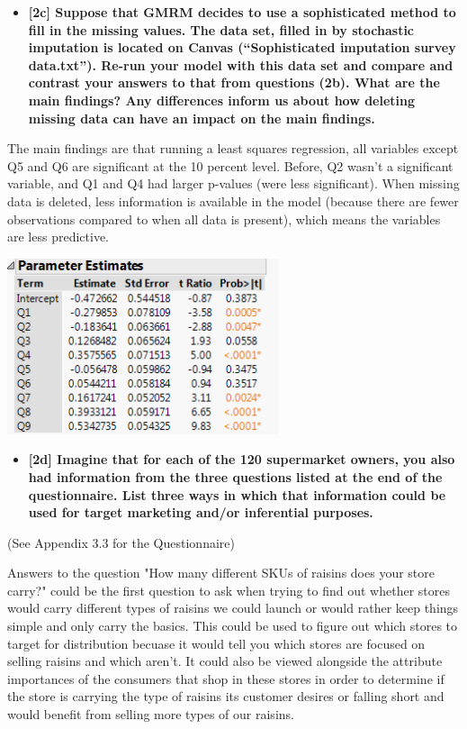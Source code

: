 \documentclass[10pt, oneside,spanish]{article}
\begin{document}
\begin{itemize}
\item \textbf{[2c]   Suppose that GMRM decides to use a sophisticated method to fill in the missing values.  The data set, filled in by stochastic imputation is located on Canvas (“Sophisticated imputation survey data.txt”).   Re-run your model with this data set and compare and contrast your answers to that from questions (2b).  What are the main findings? Any differences inform us about how deleting missing data can have an impact on the main findings.  }
\end{itemize}

The main findings are that running a least squares regression, all variables except Q5 and Q6 are significant at the 10 percent level. Before, Q2 wasn't a significant variable, and Q1 and Q4 had larger p-values (were less significant).  When missing data is deleted, less information is available in the model (because there are fewer observations compared to when all data is present), which means the variables are less predictive.
   

\begin{center}
\includegraphics[width=8cm]{2c.PNG}
\end{center}

\pagebreak

\begin{itemize}
\item \textbf{[2d]  Imagine that for each of the 120 supermarket owners, you also had information from the three questions listed at the end of the questionnaire.  List three ways in which that information could be used for target marketing and/or inferential purposes.   }
\end{itemize}

(See Appendix 3.3 for the Questionnaire)

Answers to the question "How many different SKUs of raisins does your store carry?" could be the first question to ask when trying to find out whether stores would carry different types of raisins we could launch or would rather keep things simple and only carry the basics.  This could be used to figure out which stores to target for distribution becuase it would tell you which stores are focused on selling raisins and which aren't.  It could also be viewed alongside the attribute importances of the consumers that shop in these stores in order to determine if the store is carrying the type of raisins its customer desires or falling short and would benefit from selling more types of our raisins.  
\end{document}
